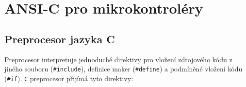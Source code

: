 
\chapter{ANSI-C pro mikrokontroléry}
\minitoc

  \section{Preprocesor jazyka C}
    Preprocesor interpretuje jednoduché direktivy pro vložení zdrojového kódu z jiného souboru 
    (\lstinline[basicstyle=\ttfamily]!#include!), definice maker 
    (\lstinline[basicstyle=\ttfamily]!#define!) a podmíněné vložení kódu 
    (\lstinline[basicstyle=\ttfamily]!#if!). \texttt{C} preprocesor přijímá tyto direktivy:
    
